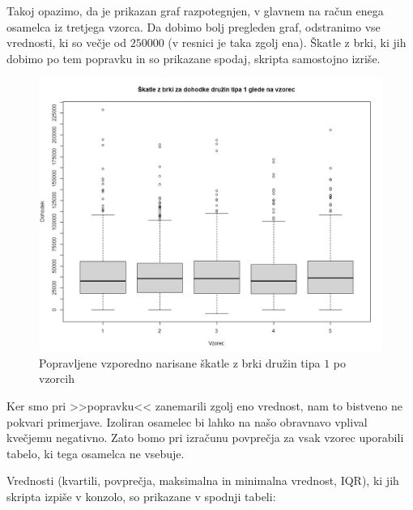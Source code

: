 \documentclass[a4paper, 10pt]{article}
\begin{document}
	Takoj opazimo, da je prikazan graf razpotegnjen, v glavnem na račun enega osamelca iz tretjega vzorca. Da dobimo bolj pregleden graf, odstranimo vse vrednosti, ki so večje od $250000$ (v resnici je taka zgolj ena). Škatle z brki, ki jih dobimo po tem popravku in so prikazane spodaj, skripta samostojno izriše.
	\newpage
	\begin{figure}[h!]
		\centering
		\includegraphics[scale = 0.4]{LepseSkatlezbrkiB}
		\caption{Popravljene vzporedno narisane škatle z brki družin tipa $1$ po vzorcih}
	\end{figure}
	
	Ker smo pri >>popravku<< zanemarili zgolj eno vrednost, nam to bistveno ne pokvari primerjave. Izoliran osamelec bi lahko na našo obravnavo vplival kvečjemu negativno. Zato bomo pri izračunu povprečja za vsak vzorec uporabili tabelo, ki tega osamelca ne vsebuje.
	
	Vrednosti (kvartili, povprečja, maksimalna in minimalna vrednost, IQR), ki jih skripta izpiše v konzolo, so prikazane v spodnji tabeli:
	
\end{document}
